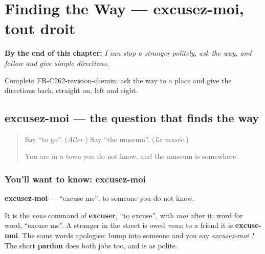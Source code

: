 
\chapter{Finding the Way — excusez-moi, tout droit}
\label{ch:fr-finding-the-way}

\begin{chapteropening}
\textbf{By the end of this chapter:} \emph{I can stop a stranger politely, ask the way, and follow and give simple directions.}

Complete FR-C262-revision-chemin: ask the way to a place and give the directions back, straight on, left and right.
\end{chapteropening}

\section[excusez-moi, pour aller à… ?]{excusez-moi — the question that finds the way}

\label{lesson:FR-C262-excusez-moi}



\begin{quote}
Say \textquotedblleft{}to go\textquotedblright{}. (\emph{Aller.}) Say \textquotedblleft{}the museum\textquotedblright{}. (\emph{Le musée.})

You are in a town you do not know, and the museum is somewhere.
\end{quote}

\subsection*{You'll want to know: excusez-moi}
\textbf{excusez-moi} — \textquotedblleft{}excuse me\textquotedblright{}, to someone you do not know.

It is the \emph{vous} command of \textbf{excuser}, \textquotedblleft{}to excuse\textquotedblright{}, with \emph{moi} after it: word for word, \textquotedblleft{}excuse me\textquotedblright{}. A stranger in the street is owed \emph{vous}; to a friend it is \textbf{excuse-moi}. The same words apologise: bump into someone and you say \emph{excusez-moi !} The short \textbf{pardon} does both jobs too, and is as polite.

